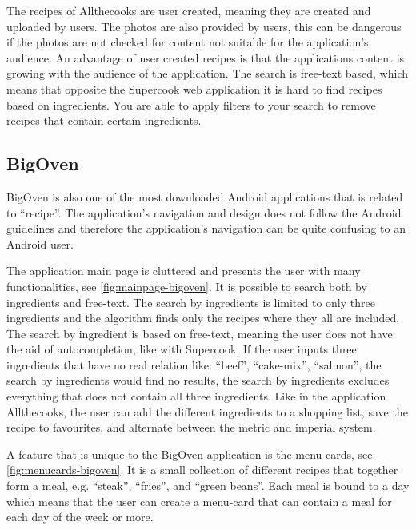 The recipes of Allthecooks are user created, meaning they are created and uploaded by users. The photos are also provided by users, this can be dangerous if the photos are not checked for content not suitable for the application's audience. An advantage of user created recipes is that the applications content is growing with the audience of the application.
The search is free-text based, which means that opposite the Supercook web application it is hard to find recipes based on ingredients. You are able to apply filters to your search to remove recipes that contain certain ingredients.

\subsection{BigOven}
BigOven is also one of the most downloaded \cite{bigoven-googleplay} Android applications that is related to ``recipe''. The application's navigation and design does not follow the Android guidelines\cite{guidelines-appstructure} and therefore the application's navigation can be quite confusing to an Android user.

The application main page is cluttered and presents the user with many functionalities, see \autoref{fig:mainpage-bigoven}. It is possible to search both by ingredients and free-text. The search by ingredients is limited to only three ingredients and the algorithm finds only the recipes where they all are included. The search by ingredient is based on free-text, meaning the user does not have the aid of autocompletion, like with Supercook. If the user inputs three ingredients that have no real relation like: ``beef'', ``cake-mix'', ``salmon'', the search by ingredients would find no results, the search by ingredients excludes everything that does not contain all three ingredients. 
Like in the application Allthecooks, the user can add the different ingredients to a shopping list, save the recipe to favourites, and alternate between the metric and imperial system.

A feature that is unique to the BigOven application is the menu-cards, see \autoref{fig:menucards-bigoven}.
It is a small collection of different recipes that together form a meal, e.g. ``steak'', ``fries'', and ``green beans''. Each meal is bound to a day which means that the user can create a menu-card that can contain a meal for each day of the week or more. 

